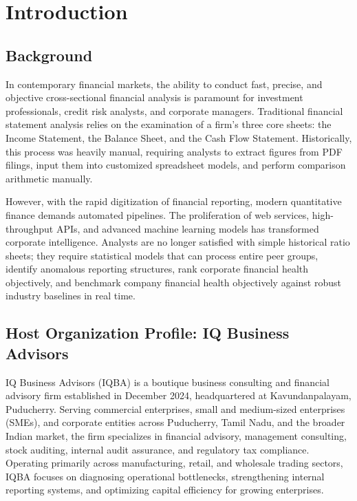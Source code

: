 \chapter{Introduction}
\label{ch:intro}

\section{Background}
In contemporary financial markets, the ability to conduct fast, precise, and objective cross-sectional financial analysis is paramount for investment professionals, credit risk analysts, and corporate managers. Traditional financial statement analysis relies on the examination of a firm's three core sheets: the Income Statement, the Balance Sheet, and the Cash Flow Statement. Historically, this process was heavily manual, requiring analysts to extract figures from PDF filings, input them into customized spreadsheet models, and perform comparison arithmetic manually. 

However, with the rapid digitization of financial reporting, modern quantitative finance demands automated pipelines. The proliferation of web services, high-throughput APIs, and advanced machine learning models has transformed corporate intelligence. Analysts are no longer satisfied with simple historical ratio sheets; they require statistical models that can process entire peer groups, identify anomalous reporting structures, rank corporate financial health objectively, and benchmark company financial health objectively against robust industry baselines in real time.

\section{Host Organization Profile: IQ Business Advisors}
\label{sec:company_profile}
IQ Business Advisors (IQBA) is a boutique business consulting and financial advisory firm established in December 2024, headquartered at Kavundanpalayam, Puducherry. Serving commercial enterprises, small and medium-sized enterprises (SMEs), and corporate entities across Puducherry, Tamil Nadu, and the broader Indian market, the firm specializes in financial advisory, management consulting, stock auditing, internal audit assurance, and regulatory tax compliance. Operating primarily across manufacturing, retail, and wholesale trading sectors, IQBA focuses on diagnosing operational bottlenecks, strengthening internal reporting systems, and optimizing capital efficiency for growing enterprises.

